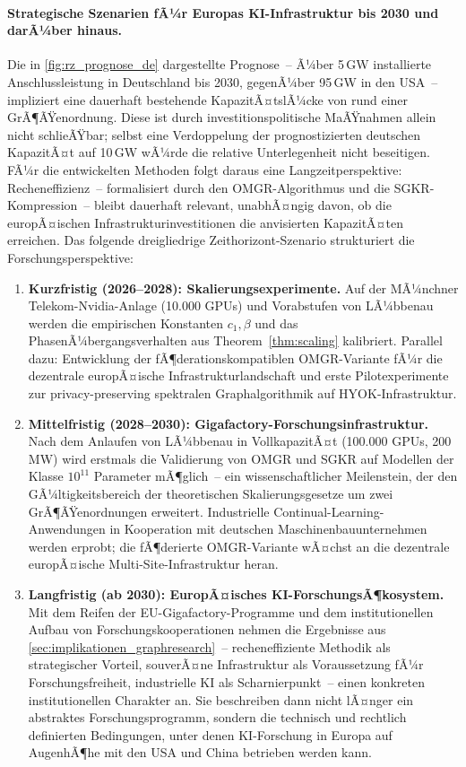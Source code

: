 ﻿\documentclass[12pt, a4paper, openany]{report}
\begin{document}
\paragraph{Strategische Szenarien fÃ¼r Europas KI-Infrastruktur bis 2030
  und darÃ¼ber hinaus.}
Die in \cref{fig:rz_prognose_de} dargestellte Prognose~-- Ã¼ber 5\,GW
installierte Anschlussleistung in Deutschland bis 2030, gegenÃ¼ber
95\,GW in den USA~-- impliziert eine dauerhaft bestehende
KapazitÃ¤tslÃ¼cke von rund einer GrÃ¶ÃŸenordnung.  Diese ist durch
investitionspolitische MaÃŸnahmen allein nicht schlieÃŸbar; selbst eine
Verdoppelung der prognostizierten deutschen KapazitÃ¤t auf 10\,GW wÃ¼rde
die relative Unterlegenheit nicht beseitigen.  FÃ¼r die entwickelten
Methoden folgt daraus eine Langzeitperspektive: Recheneffizienz~--
formalisiert durch den OMGR-Algorithmus und die SGKR-Kompression~--
bleibt dauerhaft relevant, unabhÃ¤ngig davon, ob die europÃ¤ischen
Infrastrukturinvestitionen die anvisierten KapazitÃ¤ten erreichen.
Das folgende dreigliedrige Zeithorizont-Szenario strukturiert die
Forschungsperspektive:
\begin{enumerate}[label=(\alph*)]
  \item \textbf{Kurzfristig (2026--2028): Skalierungsexperimente.}
    Auf der MÃ¼nchner Telekom-Nvidia-Anlage (10.000 GPUs) und
    Vorabstufen von LÃ¼bbenau werden die empirischen Konstanten
    $c_1, \beta$ und das PhasenÃ¼bergangsverhalten aus
    Theorem~\ref{thm:scaling} kalibriert.  Parallel dazu: Entwicklung
    der fÃ¶derationskompatiblen OMGR-Variante fÃ¼r die dezentrale
    europÃ¤ische Infrastrukturlandschaft und erste Pilotexperimente zur
    privacy-preserving spektralen Graphalgorithmik auf
    HYOK-Infrastruktur.
  \item \textbf{Mittelfristig (2028--2030): Gigafactory-Forschungsinfrastruktur.}
    Nach dem Anlaufen von LÃ¼bbenau in VollkapazitÃ¤t (100.000 GPUs,
    200\,MW) wird erstmals die Validierung von OMGR und SGKR auf
    Modellen der Klasse $10^{11}$ Parameter mÃ¶glich~-- ein
    wissenschaftlicher Meilenstein, der den GÃ¼ltigkeitsbereich der
    theoretischen Skalierungsgesetze um zwei GrÃ¶ÃŸenordnungen erweitert.
    Industrielle Continual-Learning-Anwendungen in Kooperation mit
    deutschen Maschinenbauunternehmen werden erprobt; die fÃ¶derierte
    OMGR-Variante wÃ¤chst an die dezentrale europÃ¤ische
    Multi-Site-Infrastruktur heran.
  \item \textbf{Langfristig (ab 2030): EuropÃ¤isches KI-ForschungsÃ¶kosystem.}
    Mit dem Reifen der EU-Gigafactory-Programme und dem institutionellen
    Aufbau von Forschungskooperationen nehmen die Ergebnisse aus
    \cref{sec:implikationen_graphresearch}~-- recheneffiziente Methodik
    als strategischer Vorteil, souverÃ¤ne Infrastruktur als Voraussetzung
    fÃ¼r Forschungsfreiheit, industrielle KI als
    Scharnierpunkt~-- einen konkreten institutionellen Charakter an.
    Sie beschreiben dann nicht lÃ¤nger ein abstraktes Forschungsprogramm,
    sondern die technisch und rechtlich definierten Bedingungen, unter
    denen KI-Forschung in Europa auf AugenhÃ¶he mit den USA und China
    betrieben werden kann.
\end{enumerate}
\end{document}
